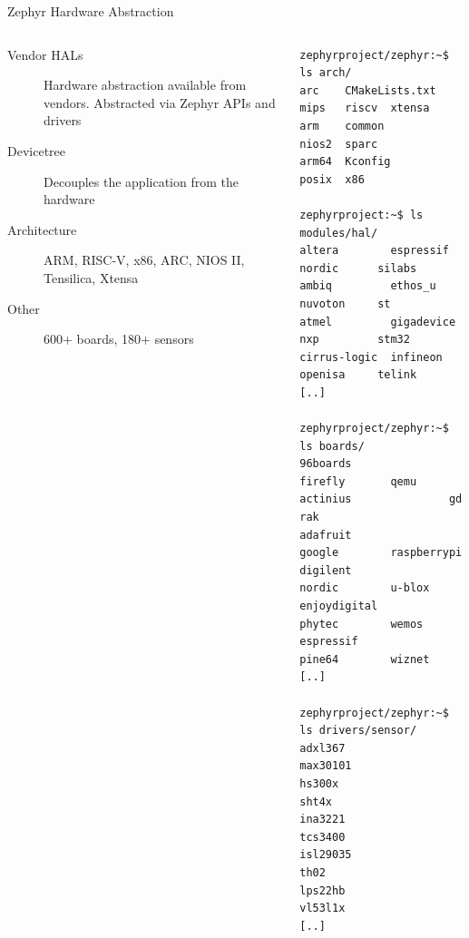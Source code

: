 \documentclass[10pt, aspectratio=169]{beamer}
\begin{document}
\begin{frame}[fragile]{Zephyr Hardware Abstraction}
  \begin{columns}
    \begin{column}{0.6\textwidth}
      \begin{description}
          \item [Vendor HALs] Hardware abstraction available from vendors.
                  Abstracted via Zephyr APIs and drivers
          \item [Devicetree] Decouples the application from the hardware
          \item [Architecture] ARM, RISC-V, x86, ARC, NIOS II, Tensilica, Xtensa
          \item [Other] 600+ boards, 180+ sensors
      \end{description}
    \end{column}
    \begin{column}{0.4\textwidth}
      \begin{listing}[H]
        \begin{verbatim}
zephyrproject/zephyr:~$ ls arch/
arc    CMakeLists.txt  mips   riscv  xtensa
arm    common          nios2  sparc
arm64  Kconfig         posix  x86

zephyrproject:~$ ls modules/hal/
altera        espressif   nordic      silabs
ambiq         ethos_u     nuvoton     st
atmel         gigadevice  nxp         stm32
cirrus-logic  infineon    openisa     telink
[..]

zephyrproject/zephyr:~$ ls boards/
96boards               firefly       qemu
actinius               gd            rak
adafruit               google        raspberrypi
digilent               nordic        u-blox
enjoydigital           phytec        wemos
espressif              pine64        wiznet
[..]

zephyrproject/zephyr:~$ ls drivers/sensor/
adxl367                max30101
hs300x                 sht4x
ina3221                tcs3400
isl29035               th02
lps22hb                vl53l1x
[..]
        \end{verbatim}
      \end{listing}
    \end{column}
  \end{columns}
\end{frame}
\end{document}
